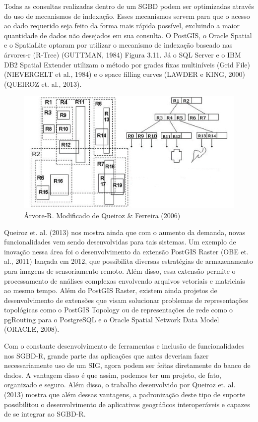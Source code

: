 		Todas as consultas realizadas dentro de um SGBD podem ser optimizadas através do uso de mecanismos de indexação. Esses mecanismos servem para que o acesso ao dado requerido seja feito da forma mais rápida possível, excluindo a maior quantidade de dados não desejados em sua consulta. O PostGIS, o Oracle Spatial e o SpatiaLite optaram por utilizar o mecanismo de indexação baseado nas árvores-r (R-Tree) (GUTTMAN, 1984) Figura 3.11. Já o SQL Server e o IBM DB2 Spatial Extender utilizam o método por grades fixas multiníveis (Grid File) (NIEVERGELT et al., 1984) e o space filling curves (LAWDER e KING, 2000) (QUEIROZ et. al., 2013).
		
		\begin{figure}
			\centering
			\includegraphics[width=1\linewidth]{data/arvore_r}
			\caption{Árvore-R. Modificado de Queiroz \& Ferreira (2006)}
			\label{fig:arvorer}
		\end{figure}
	
		Queiroz et. al. (2013) nos mostra ainda que com o aumento da demanda, novas funcionalidades vem sendo desenvolvidas para tais sistemas. Um exemplo de inovação nessa área foi o desenvolvimento da extensão PostGIS Raster (OBE et. al., 2011) lançada em 2012, que possibilita diversas estratégias de armazenamento para imagens de sensoriamento remoto. Além disso, essa extensão permite o processamento de análises complexas envolvendo arquivos vetoriais e matriciais ao mesmo tempo. Além do PostGIS Raster, existem ainda projetos de desenvolvimento de extensões que visam solucionar problemas de representações topológicas como o PostGIS Topology ou de representações de rede como o pgRouting para o PostgreSQL e o Oracle Spatial Network Data Model (ORACLE, 2008).
		
		Com o constante desenvolvimento de ferramentas e inclusão de funcionalidades nos SGBD-R, grande parte das aplicações que antes deveriam fazer necessariamente uso de um SIG, agora podem ser feitas diretamente do banco de dados. A vantagem disso é que assim, podemos ter um projeto, de fato, organizado e seguro. Além disso, o trabalho desenvolvido por Queiroz et. al. (2013) mostra que além dessas vantagens, a padronização deste tipo de suporte possibilitou o desenvolvimento de aplicativos geográficos interoperáveis e capazes de se integrar ao SGBD-R.
		
